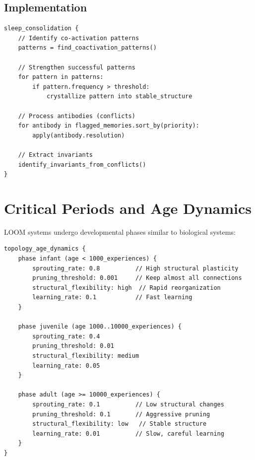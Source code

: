 \documentclass[12pt,a4paper,openany]{book} %
\begin{document}
\subsection{Implementation}

\vspace{0.5em}
\begin{lstlisting}[language=loom]
sleep_consolidation {
    // Identify co-activation patterns
    patterns = find_coactivation_patterns()

    // Strengthen successful patterns
    for pattern in patterns:
        if pattern.frequency > threshold:
            crystallize pattern into stable_structure

    // Process antibodies (conflicts)
    for antibody in flagged_memories.sort_by(priority):
        apply(antibody.resolution)

    // Extract invariants
    identify_invariants_from_conflicts()
}
\end{lstlisting}
\vspace{0.5em}

\section{Critical Periods and Age Dynamics}

LOOM systems undergo developmental phases similar to biological systems:

\vspace{0.5em}
\begin{lstlisting}[language=loom]
topology_age_dynamics {
    phase infant (age < 1000_experiences) {
        sprouting_rate: 0.8          // High structural plasticity
        pruning_threshold: 0.001     // Keep almost all connections
        structural_flexibility: high  // Rapid reorganization
        learning_rate: 0.1           // Fast learning
    }

    phase juvenile (age 1000..10000_experiences) {
        sprouting_rate: 0.4
        pruning_threshold: 0.01
        structural_flexibility: medium
        learning_rate: 0.05
    }

    phase adult (age >= 10000_experiences) {
        sprouting_rate: 0.1          // Low structural changes
        pruning_threshold: 0.1       // Aggressive pruning
        structural_flexibility: low   // Stable structure
        learning_rate: 0.01          // Slow, careful learning
    }
}
\end{lstlisting}
\vspace{0.5em}
\end{document}
